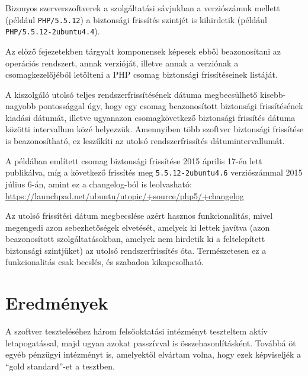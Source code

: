 	Bizonyos szerverszoftverek a szolgáltatási sávjukban a verziószámuk mellett (például \texttt{PHP/5.5.12}) a biztonsági frissítés szintjét is kihirdetik (például \texttt{PHP/5.5.12-2ubuntu4.4}).
	
	Az előző fejezetekben tárgyalt komponensek képesek ebből beazonosítani az operációs rendszert, annak verzióját, illetve annak a verziónak a csomagkezelőjéből letölteni a PHP csomag biztonsági frissítéseinek listáját.
	
	A kiszolgáló utolsó teljes rendszerfrissítésének dátuma megbecsülhető kisebb-nagyobb pontossággal úgy, hogy egy csomag beazonosított biztonsági frissítésének kiadási dátumát, illetve ugyanazon csomagkövetkező biztonsági frissítés dátuma közötti intervallum közé helyezzük. Amennyiben több szoftver biztonsági frissítése is beazonosítható, ez leszűkíti az utolsó rendszerfrissítés dátumintervallumát.
	
	A példában említett csomag biztonsági frissítése 2015 április 17-én lett publikálva, míg a következő frissítés meg \texttt{5.5.12-2ubuntu4.6} verziószámmal 2015 július 6-án, amint ez a changelog-ból is leolvasható: \url{https://launchpad.net/ubuntu/utopic/+source/php5/+changelog}
	
	Az utolsó frissítési dátum megbecslése azért hasznos funkcionalitás, mivel megengedi azon sebezhetőségek elvetését, amelyek ki lettek javítva (azon beazonosított szolgáltatásokban, amelyek nem hirdetik ki a feltelepített biztonsági szintjüket) az utolsó rendszerfrissítés óta. Természetesen ez a funkcionalitás csak becslés, és szabadon kikapcsolható.

\section*{Eredmények}

	A szoftver teszteléséhez három felsőoktatási intézményt teszteltem aktív letapogatással, majd ugyan azokat passzívval is összehasonlításként. Továbbá öt egyéb pénzügyi intézményt is, amelyektől elvártam volna, hogy ezek képviseljék a ``gold standard''-et a tesztben.

